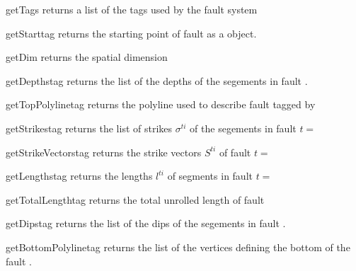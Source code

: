 \begin{methoddesc}[FaultSystem]{getTags}{}
returns a list of the tags used by the fault system
\end{methoddesc}

\begin{methoddesc}[FaultSystem]{getStart}{tag}
returns the starting point of fault  as a \numpyNDA object.
\end{methoddesc}

\begin{methoddesc}[FaultSystem]{getDim}{}
returns the spatial dimension
\end{methoddesc}

\begin{methoddesc}[FaultSystem]{getDepths}{tag}
returns the list of the depths of the segements in fault .
\end{methoddesc}


\begin{methoddesc}[FaultSystem]{getTopPolyline}{tag}
returns the polyline used to describe fault tagged by  
\end{methoddesc}

\begin{methoddesc}[FaultSystem]{getStrikes}{tag}
returns the list of strikes $\sigma^{ti}$ of the segements in fault $t=$
\end{methoddesc}


\begin{methoddesc}[FaultSystem]{getStrikeVectors}{tag}
returns the strike vectors $S^{ti}$ of fault $t=$
\end{methoddesc}


\begin{methoddesc}[FaultSystem]{getLengths}{tag}
returns the lengths $l^{ti}$ of segments in fault $t=$
\end{methoddesc}


\begin{methoddesc}[FaultSystem]{getTotalLength}{tag}
returns the total unrolled length of fault 
\end{methoddesc}

\begin{methoddesc}[FaultSystem]{getDips}{tag}
returns the list of the dips of the segements in fault .
\end{methoddesc}

\begin{methoddesc}[FaultSystem]{getBottomPolyline}{tag}
returns the list of the vertices defining the bottom of the fault .
\end{methoddesc}

